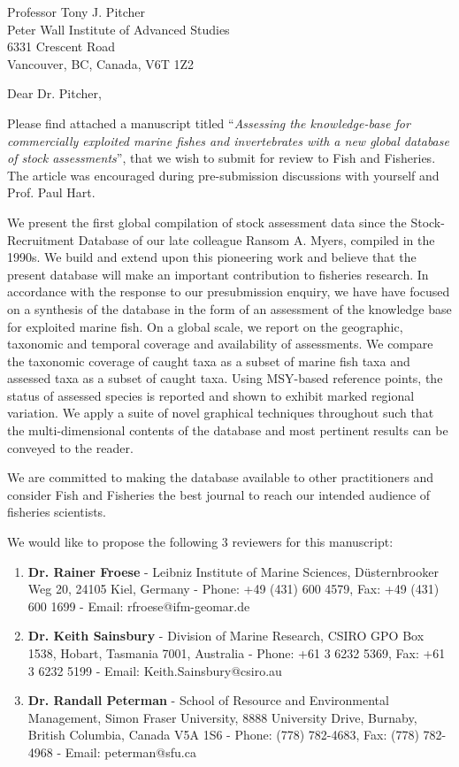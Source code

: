 \documentclass[letterpaper,12pt]{letter}
\begin{document}
\begin{letter}
{Professor Tony J. Pitcher\\Peter Wall Institute of Advanced Studies\\6331 Crescent Road\\Vancouver, BC, Canada, V6T 1Z2}

\opening{Dear Dr. Pitcher,}
Please find attached a manuscript titled ``\textit{Assessing the knowledge-base for commercially exploited marine fishes and invertebrates with a new global database of stock assessments}'', that we wish to submit
for review to Fish and Fisheries. The article was encouraged during pre-submission discussions with yourself and Prof. Paul Hart.

We present the first global compilation of stock assessment data since
the Stock-Recruitment Database of our late colleague Ransom A. Myers,
compiled in the 1990s. We build and extend upon this pioneering work
and believe that the present database will make an important
contribution to fisheries research. In accordance with the response to
our presubmission enquiry, we have have focused on a synthesis of the
database in the form of an assessment of the knowledge base for
exploited marine fish. On a global scale, we report on the geographic,
taxonomic and temporal coverage and availability of assessments. We
compare the taxonomic coverage of caught taxa as a subset of marine
fish taxa and assessed taxa as a subset of caught taxa. Using
MSY-based reference points, the status of assessed species is reported
and shown to exhibit marked regional variation. We apply a suite of
novel graphical techniques throughout such that the multi-dimensional
contents of the database and most pertinent results can be conveyed to
the reader.

We are committed to making the database available to other
practitioners and consider Fish and Fisheries the best journal to
reach our intended audience of fisheries scientists.

We would like to propose the following 3 reviewers for this manuscript:

\begin{enumerate}
 \item \textbf{Dr. Rainer Froese} - Leibniz Institute of Marine Sciences, D\"{u}sternbrooker Weg 20, 24105 Kiel, Germany - Phone: +49 (431) 600 4579, Fax: +49 (431) 600 1699 - Email: rfroese@ifm-geomar.de
 \item \textbf{Dr. Keith Sainsbury} - Division of Marine Research, CSIRO GPO Box 1538, Hobart, Tasmania 7001, Australia - Phone: +61 3 6232 5369, Fax: +61 3 6232 5199 - Email: Keith.Sainsbury@csiro.au
 \item \textbf{Dr. Randall Peterman} - School of Resource and Environmental Management, Simon Fraser University, 8888 University Drive, Burnaby, British Columbia, Canada V5A 1S6 - Phone: (778) 782-4683, Fax: (778) 782-4968 - Email: peterman@sfu.ca
\end{enumerate}


\end{letter}
\end{document}
